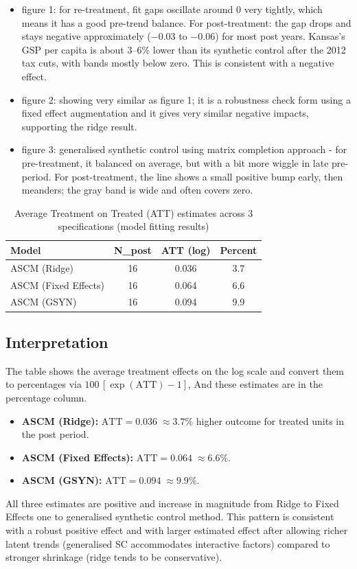 \documentclass[11pt]{article}
\begin{document}
\begin{itemize}
    \item figure 1: for re-treatment, fit gaps oscillate around 0 very tightly, which means it has a good pre-trend balance. For post-treatment: the gap drops and stays negative approximately (−0.03 to −0.06) for most post years. Kansas’s GSP per capita is about 3–6\% lower than its synthetic control after the 2012 tax cuts, with bands mostly below zero. This is consistent with a negative effect.
    \item figure 2: showing very similar as figure 1; it is a robustness check form using a fixed effect augmentation and it gives very similar negative impacts, supporting the ridge result.
    \item figure 3: generalised synthetic control using matrix completion approach - for pre-treatment, it balanced on average, but with a bit more wiggle in late pre-period. For post-treatment, the line shows a small positive bump early, then meanders; the gray band is wide and often covers zero. 
\end{itemize}

\begin{table}[t]
\centering
\caption{Average Treatment on Treated (ATT) estimates across 3 specifications (model fitting results)}
\label{tab:ascm_att_simple}
\begin{tabular}{lccc}
\hline
Model & N\_post & ATT (log) & Percent \\
\hline
ASCM (Ridge)         & 16 & 0.036 & 3.7 \\
ASCM (Fixed Effects) & 16 & 0.064 & 6.6 \\
ASCM (GSYN)          & 16 & 0.094 & 9.9 \\
\hline
\end{tabular}
\end{table}

\subsection*{Interpretation}
The table shows the average treatment effects on the log scale and convert them to percentages via
$100\,[\exp(\text{ATT})-1]$,
And these estimates are in the percentage column.

\begin{itemize}
  \item \textbf{ASCM (Ridge):} $\text{ATT}=0.036 \; \approx 3.7\%$ higher outcome for treated units in the post period.
  \item \textbf{ASCM (Fixed Effects):} $\text{ATT}=0.064 \; \approx 6.6\%$.
  \item \textbf{ASCM (GSYN):} $\text{ATT}=0.094 \; \approx 9.9\%$.
\end{itemize}

\noindent All three estimates are positive and increase in magnitude from Ridge to Fixed Effects one to generalised synthetic control method. This pattern is consistent with a robust positive effect and with larger estimated effect after allowing richer latent trends (generalised SC accommodates interactive factors) compared to stronger shrinkage (ridge tends to be conservative).

\clearpage
\Needspace{0.92\textheight} %
\end{document}
